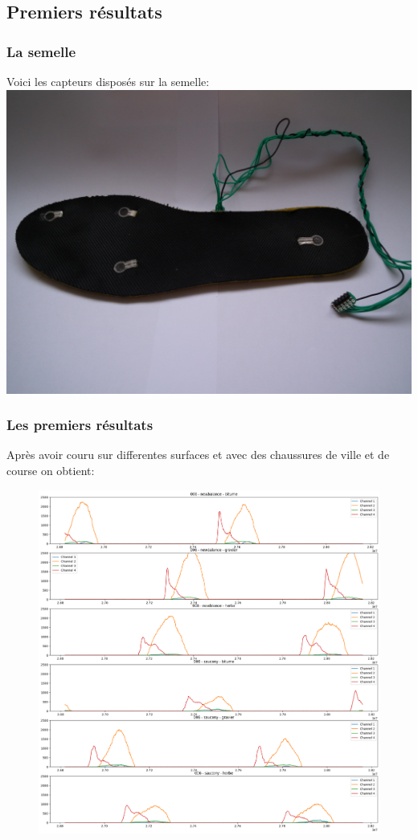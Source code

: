 \subsection{Premiers résultats}
\begin{frame}
\frametitle{La semelle}
Voici les capteurs disposés sur la semelle:
\includegraphics[width=\textwidth]{./figures/sem_00.jpg}

\end{frame}

\begin{frame}
\frametitle{Les premiers résultats}
Après avoir couru sur differentes surfaces et avec des chaussures de ville et de course on obtient:
\begin{figure}
\includegraphics[scale=0.17]{./figures/res_01.png}
\centering
\end{figure}
\end{frame}
